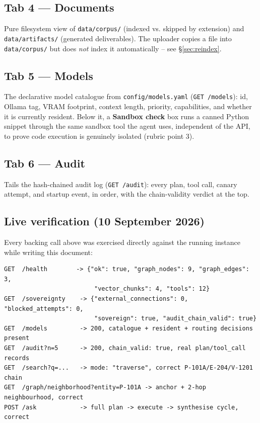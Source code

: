 \documentclass[11pt,a4paper]{article}
\newcommand{\code}[1]{\texttt{\small #1}}
\newcommand{\term}[1]{\textbf{\color{accent}#1}}
\begin{document}
\subsection{Tab 4 --- Documents}

Pure filesystem view of \code{data/corpus/} (indexed vs. skipped by extension)
and \code{data/artifacts/} (generated deliverables). The uploader copies a file
into \code{data/corpus/} but does \emph{not} index it automatically -- see
\S\ref{sec:reindex}.

\subsection{Tab 5 --- Models}

The declarative model catalogue from \code{config/models.yaml} (\code{GET
/models}): id, Ollama tag, VRAM footprint, context length, priority,
capabilities, and whether it is currently resident. Below it, a
\term{Sandbox check} box runs a canned Python snippet through the same
sandbox tool the agent uses, independent of the API, to prove code execution
is genuinely isolated (rubric point 3).

\subsection{Tab 6 --- Audit}

Tails the hash-chained audit log (\code{GET /audit}): every plan, tool call,
canary attempt, and startup event, in order, with the chain-validity verdict
at the top.

\subsection{Live verification (10 September 2026)}

Every backing call above was exercised directly against the running instance
while writing this document:

\begin{lstlisting}[style=sh]
GET  /health        -> {"ok": true, "graph_nodes": 9, "graph_edges": 3,
                         "vector_chunks": 4, "tools": 12}
GET  /sovereignty    -> {"external_connections": 0, "blocked_attempts": 0,
                         "sovereign": true, "audit_chain_valid": true}
GET  /models         -> 200, catalogue + resident + routing decisions present
GET  /audit?n=5      -> 200, chain_valid: true, real plan/tool_call records
GET  /search?q=...   -> mode: "traverse", correct P-101A/E-204/V-1201 chain
GET  /graph/neighborhood?entity=P-101A -> anchor + 2-hop neighbourhood, correct
POST /ask            -> full plan -> execute -> synthesise cycle, correct
\end{lstlisting}
\end{document}
